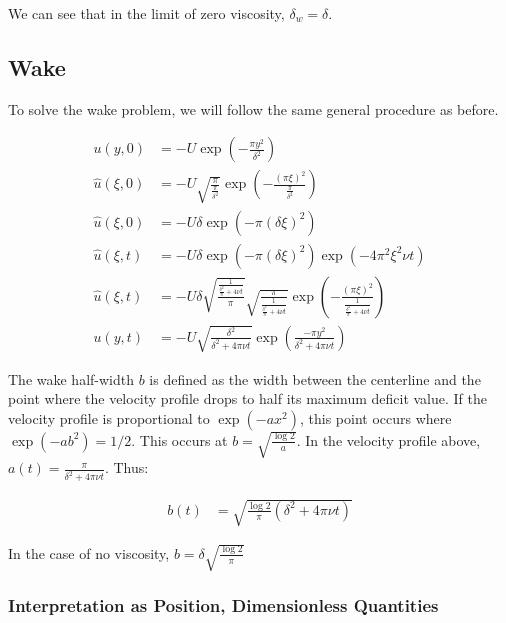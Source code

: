 \documentclass{article}
\begin{document}
We can see that in the limit of zero viscosity, $\delta_w = \delta$.

\subsection{Wake}

To solve the wake problem, we will follow the same general procedure
	as before.

\begin{align}
u(y,0) & = -U\exp\left(-\frac{\pi y^2}{\delta^2} \right)\\
\hat{u}(\xi, 0) & = - U \sqrt{ \frac{\pi}{\frac{\pi}{\delta^2}}}
	\exp \left( - \frac{ (\pi \xi)^2}{ \frac{\pi}{\delta^2}} \right)
	\nonumber \\
\hat{u}(\xi, 0)& = - U \delta \exp \left( - 
	\pi \left( \delta \xi \right)^2 \right) \\	
\hat{u}(\xi, t) & = - U \delta 
	\exp \left( - \pi \left( \delta \xi \right)^2 \right)
	\exp \left( - 4 \pi^2 \xi^2 \nu t \right) \nonumber\\
\hat{u}(\xi, t) & = - U \delta
	\sqrt{ \frac{\frac{1}{ \frac{\delta^2}{\pi} + 4 \nu t}}{\pi}}
	\sqrt{ \frac{\pi}{ \frac{1}{ \frac{\delta^2}{\pi} + 4 \nu t}}}
	\exp \left( - \frac{ ( \pi \xi )^2}
	{ \frac{1}{ \frac{\delta^2}{\pi} + 4 \nu t}} \right) \nonumber\\
u(y, t) & = - U \sqrt{ \frac{\delta^2}{ \delta^2 + 4 \pi \nu t}}
	\exp \left( \frac{-\pi y^2}{ \delta^2 + 4 \pi \nu t} \right)
\end{align}

The wake half-width $b$ is defined as the width between the centerline
	and the point where the velocity profile drops to half its
	maximum deficit value.
If the velocity profile is proportional to $\exp(-a x^2)$, this point occurs
	where $\exp(-a b^2) = 1/2$.  
This occurs at $b = \sqrt{\frac{\log 2}{a}}$.
In the velocity profile above, $a(t) = \frac{\pi}{\delta^2 + 4 \pi \nu t}$.
Thus:

\begin{align}
b(t) & = \sqrt{ \frac{ \log 2}{\pi} \left( \delta^2 + 4 \pi \nu t \right) }
\end{align}

In the case of no viscosity, $b = \delta \sqrt{\frac{\log 2}{\pi}}$

\subsubsection{Interpretation as Position, Dimensionless Quantities}
\end{document}
